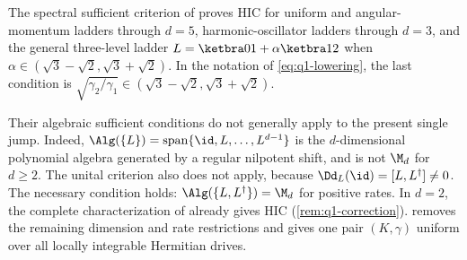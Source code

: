 \documentclass[class=article,11pt,a4paper,crop=false]{standalone}
\begin{document}
\begin{remark}\label{rem:q1-wmt}
	The spectral sufficient criterion of \cite{Wolff2026Contractivity} proves HIC
	for uniform and angular-momentum ladders through $d=5$, harmonic-oscillator
	ladders through $d=3$, and the general three-level ladder
	$L=\ketbra01+\alpha\ketbra12$ when
	$\alpha\in(\sqrt3-\sqrt2,\sqrt3+\sqrt2)$. In the notation of
	\eqref{eq:q1-lowering}, the last condition is
	$\sqrt{\gamma_2/\gamma_1}\in(\sqrt3-\sqrt2,\sqrt3+\sqrt2)$.

	Their algebraic sufficient conditions do not generally apply to the present
	single jump. Indeed,
	$\Alg(\{L\})=\operatorname{span}\{\id,L,\dots,L^{d-1}\}$ is the
	$d$-dimensional polynomial algebra generated by a regular nilpotent shift,
	and is not $\M_d$ for $d\ge2$. The unital criterion also does not apply,
	because $\Dd_L(\id)=[L,L^\dagger]\ne0$. The necessary condition holds:
	$\Alg(\{L,L^\dagger\})=\M_d$ for positive rates. In $d=2$, the complete
	characterization of \cite{Wolff2026Contractivity} already gives HIC
	(\cref{rem:q1-correction}).  removes the remaining
	dimension and rate restrictions and gives one pair $(K,\gamma)$ uniform over
	all locally integrable Hermitian drives.
\end{remark}
\end{document}
